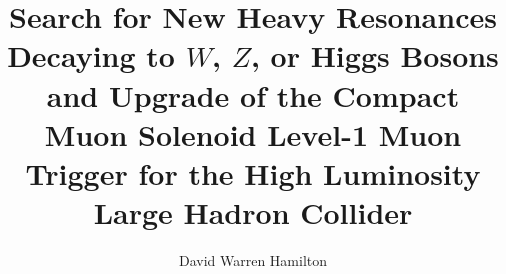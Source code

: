 \documentclass[PhD]{uclathes}
\title{
  Search for New Heavy Resonances Decaying to $W$, $Z$, or Higgs Bosons and Upgrade of the Compact Muon Solenoid Level-1 Muon Trigger for the High Luminosity Large Hadron Collider
}
\author{David Warren Hamilton}
\begin{document}
\makeintropages















%



\end{document}
